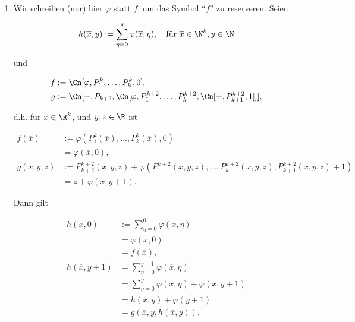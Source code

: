 \begin{solution}

\phantom{}

\begin{enumerate}[label = (\alph*)]

    \item Wir schreiben (nur) hier $\varphi$ statt $f$, um das Symbol \enquote{$f$} zu reserveren.
    Seien

    \begin{align*}
        h(\overline x, y)
        :=
        \sum_{\eta = 0}^y
            \varphi(\overline x, \eta),
        \quad
        \text{für}~
        \overline x \in \N^k,
        y \in \N
    \end{align*}

    und

    \begin{align*}
        f & := \Cn[\varphi, P_1^k, \dots, P_k^k, 0], \\
        g & := \Cn[+, P_{k+2}, \Cn[\varphi, P_1^{k+2}, \dots, P_k^{k+2}, \Cn[+, P_{k+1}^{k+2}, 1]]],
    \end{align*}

    d.h. für $\overline x \in \R^k$, und $y, z \in \R$ ist

    \begin{align*}
        f(\overline x)
        & :=
        \varphi(P_1^k(\overline x), \dots, P_k^k(\overline x), 0) \\
        & =
        \varphi(\overline x, 0), \\
        g(\overline x, y, z)
        & :=
        P_{k+2}^{k+2}(\overline x, y, z)
        +
        \varphi(P_1^{k+2}(\overline x, y, z), \dots, P_k^{k+2}(\overline x, y, z), P_{k+1}^{k+2}(\overline x, y, z) + 1) \\
        & =
        z + \varphi(\overline x, y + 1).
    \end{align*}

    Dann gilt

    \begin{align*}
        h(\overline x, 0)
        & :=
        \sum_{\eta = 0}^0
            \varphi(\overline x, \eta) \\
        & =
        \varphi(\overline x, 0) \\
        & =
        f(\overline x), \\
        h(\overline x, y + 1)
        & =
        \sum_{\eta = 0}^{y+1}
            \varphi(\overline x, \eta) \\
        & =
        \sum_{\eta = 0}^y
            \varphi(\overline x, \eta)
        +
        \varphi(\overline x, y + 1) \\
        & =
        h(\overline x, y) + \varphi(y + 1) \\
        & =
        g(\overline x, y, h(\overline x, y)).
    \end{align*}


\end{enumerate}
\end{solution}
